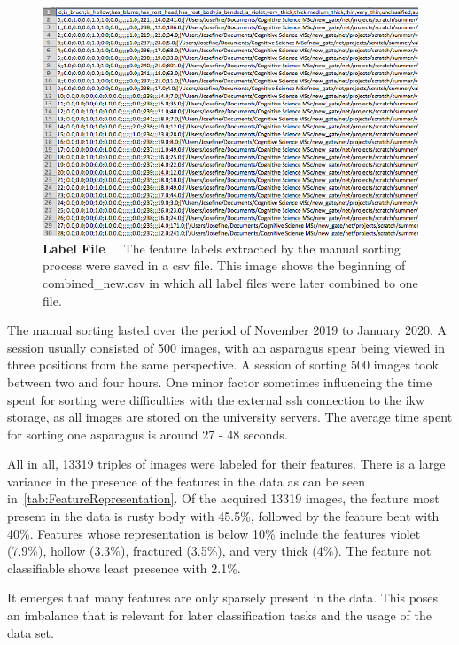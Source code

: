 \begin{figure}[!ht]
	\centering
	\includegraphics[scale=0.5]{Figures/chapter03/csv_overview.png}
	\decoRule
	\caption[Manual Labeling Output CSV-File]{\textbf{Label File}~~~The feature labels extracted by the manual sorting process were saved in a csv file. This image shows the beginning of combined\_new.csv in which all label files were later combined to one file.}
	\label{fig:CSVfileOverview}
\end{figure}

\bigskip
The manual sorting lasted over the period of November 2019 to January 2020. A session usually consisted of 500 images, with an asparagus spear being viewed in three positions from the same perspective. A session of sorting 500 images took between two and four hours. One minor factor sometimes influencing the time spent for sorting were difficulties with the external \acrshort{ssh} connection to the \acrshort{ikw} storage, as all images are stored on the university servers. The average time spent for sorting one asparagus is around 27 - 48 seconds.

All in all, 13319 triples of images were labeled for their features. There is a large variance in the presence of the features in the data as can be seen in~\autoref{tab:FeatureRepresentation}. Of the acquired 13319 images, the feature most present in the data is rusty body with 45.5\%, followed by the feature bent with 40\%. Features whose representation is below 10\% include the features violet (7.9\%), hollow (3.3\%), fractured (3.5\%), and very thick (4\%). The feature not classifiable shows least presence with 2.1\%. 

It emerges that many features are only sparsely present in the data. This poses an imbalance that is relevant for later classification tasks and the usage of the data set.

